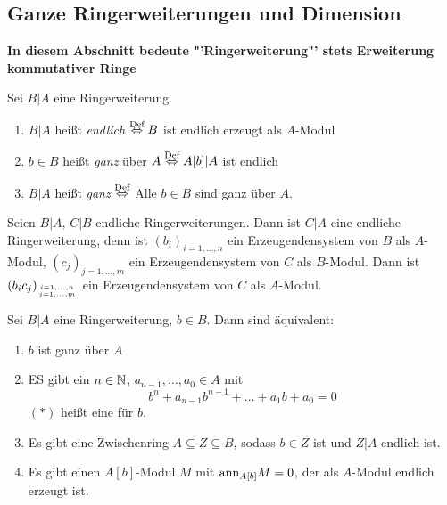 \subsection{Ganze Ringerweiterungen und Dimension}
\begin{center}
	\textbf{In diesem Abschnitt bedeute "'Ringerweiterung"' stets Erweiterung kommutativer Ringe}
\end{center}
\begin{df}
	Sei $B|A$ eine Ringerweiterung.
	\begin{enumerate}
		\item[] $B|A$ heißt \emph{endlich} $\overset{\text{Def}}{\Leftrightarrow} B$ ist endlich erzeugt als $A$-Modul
		\item[] $b\in B$ heißt \emph{ganz} über $A \overset{\text{Def}}{\Leftrightarrow} A[b]|A$ ist endlich
		\item[] $B|A$ heißt \emph{ganz} $\overset{\text{Def}}{\Leftrightarrow}$ Alle $b\in B$ sind ganz über $A$.
	\end{enumerate}
\end{df}
\begin{anm}
	Seien $B|A, \, C|B$ endliche Ringerweiterungen. Dann ist $C|A$ eine endliche Ringerweiterung, denn ist $(b_i)_{i=1, \ldots, n}$ ein Erzeugendensystem von $B$ als $A$-Modul, $(c_j)_{j=1, \ldots, m}$ ein Erzeugendensystem von $C$ als $B$-Modul. Dann ist $(b_ic_j)_{i=1, \ldots, n\atop j=1,\ldots, m}$ ein Erzeugendensystem von $C$ als $A$-Modul.
\end{anm}
\begin{sa}\label{15.2}
	Sei $B|A$ eine Ringerweiterung, $b\in B$. Dann sind äquivalent:
	\begin{enumerate}[label= \roman*)]
		\item $b$ ist ganz über $A$
		\item ES gibt ein $n\in \mathbb{N}$, $a_{n-1}, \ldots, a_0\in A$ mit 
		\begin{equation}\tag{$\ast$}
		b^n + a_{n-1}b^{n-1} + \ldots + a_1 b + a_0 =0
		\end{equation}
		$(\ast)$ heißt eine  für $b$.
		\item Es gibt eine Zwischenring $A\subseteq Z\subseteq B$, sodass $b\in Z$ ist und $Z|A$ endlich ist.
		\item Es gibt einen $A[b]$-Modul $M$ mit $\text{ann}_{A[b]} M =0$, der als $A$-Modul endlich erzeugt ist.
	\end{enumerate}
\end{sa}
